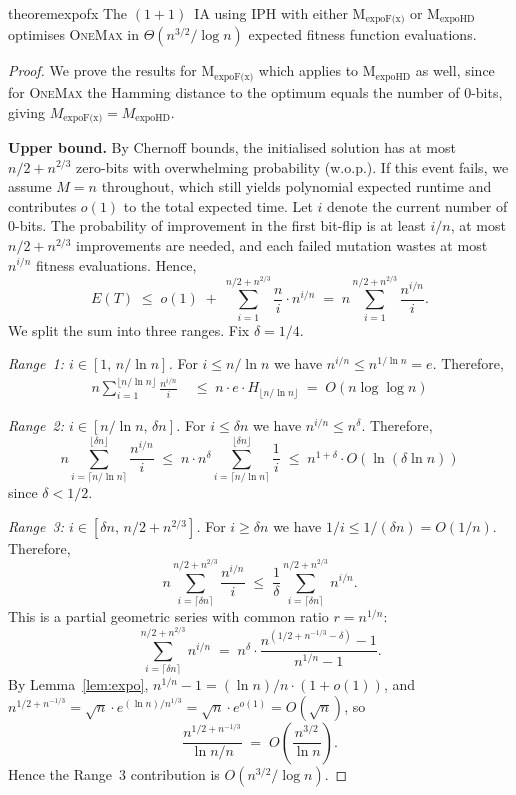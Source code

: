 \documentclass[lettersize,journal]{IEEEtran}
\newcommand{\oneoneIA}{$(1+1)$~IA}
\newcommand{\expoF}{M$_{\text{expoF(x)}}$}
\newcommand{\expoHD}{M$_{\text{expoHD}}$}
\begin{document}
\begin{restatable}{theorem}{expofx} \label{cor:omexpohd}
The {\oneoneIA } using IPH with either {\expoF } or {\expoHD } optimises \textsc{OneMax} in $\Theta(n^{3/2}/\log n)$ expected fitness function evaluations.
\end{restatable}

\begin{proof}
We prove the results for \expoF{} which applies to \expoHD{} as well, since for \textsc{OneMax} the Hamming distance to the optimum equals the number of 0-bits, giving $M_{\text{expoF(x)}}=M_{\text{expoHD}}$.

\medskip
\noindent\textbf{Upper bound.}
By Chernoff bounds, the initialised solution has at most $n/2+n^{2/3}$ zero-bits with overwhelming probability (w.o.p.). If this event fails, we assume $M=n$ throughout, which still yields polynomial expected runtime and contributes $o(1)$ to the total expected time. Let $i$ denote the current number of 0-bits. The probability of improvement in the first bit-flip is at least $i/n$, at most $n/2+n^{2/3}$ improvements are needed, and each failed mutation wastes at most $n^{i/n}$ fitness evaluations. Hence,
\[
E(T) \;\leq\; o(1) \;+\; \sum_{i=1}^{n/2+n^{2/3}} \frac{n}{i}\cdot n^{i/n}
\;=\; n\sum_{i=1}^{n/2+n^{2/3}} \frac{n^{i/n}}{i}.
\]
We split the sum into three ranges. Fix $\delta=1/4$.

\emph{Range~1: $i\in[1,\,n/\ln n]$.}
For $i\leq n/\ln n$ we have $n^{i/n}\leq n^{1/\ln n}=e$.
Therefore,
\begin{align*}
n\sum_{i=1}^{\lfloor n/\ln n\rfloor}\frac{n^{i/n}}{i}
\;&\leq\; n\cdot e\cdot H_{\lfloor n/\ln n\rfloor}
\;=\; O(n\log\log n)
\end{align*}


\emph{Range~2: $i\in[n/\ln n,\,\delta n]$.}
For $i\leq \delta n$ we have $n^{i/n}\leq n^{\delta}$.
Therefore,
\[
n\sum_{i=\lceil n/\ln n\rceil}^{\lfloor\delta n\rfloor}\frac{n^{i/n}}{i}
\;\leq\; n\cdot n^{\delta}\sum_{i=\lceil n/\ln n\rceil}^{\lfloor\delta n\rfloor}\frac{1}{i}
\;\leq\; n^{1+\delta}\cdot O(\ln(\delta\ln n))
\]
since $\delta<1/2$.

\emph{Range~3: $i\in[\delta n,\,n/2+n^{2/3}]$.}
For $i\geq \delta n$ we have $1/i\leq 1/(\delta n)=O(1/n)$.
Therefore,
\[
n\sum_{i=\lceil\delta n\rceil}^{n/2+n^{2/3}}\frac{n^{i/n}}{i}
\;\leq\; \frac{1}{\delta}\sum_{i=\lceil\delta n\rceil}^{n/2+n^{2/3}} n^{i/n}.
\]
This is a partial geometric series with common ratio $r=n^{1/n}$:
\[
\sum_{i=\lceil\delta n\rceil}^{n/2+n^{2/3}} n^{i/n}
\;=\; n^{\delta}\cdot\frac{n^{(1/2+n^{-1/3}-\delta)}-1}{n^{1/n}-1}.
\]
By Lemma~\ref{lem:expo}, $n^{1/n}-1=(\ln n)/n\cdot(1+o(1))$, and $n^{1/2+n^{-1/3}}=\sqrt{n}\cdot e^{(\ln n)/n^{1/3}}=\sqrt{n}\cdot e^{o(1)}=O(\sqrt{n})$, so
\[
\frac{n^{1/2+n^{-1/3}}}{\ln n/n}
\;=\; O\!\left(\frac{n^{3/2}}{\ln n}\right).
\]
Hence the Range~3 contribution is $O(n^{3/2}/\log n)$.


\end{proof}
\end{document}
